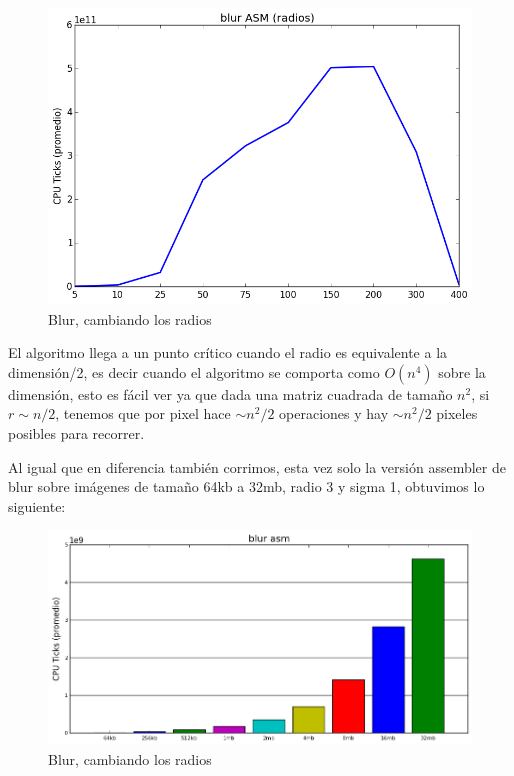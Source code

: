 \documentclass[a4paper]{article}
\begin{document}
\begin{figure}[h]
	\centerline{\includegraphics[scale=0.62]{imagenes/test_radio_size_ASM.png}}
	\caption{Blur, cambiando los radios}
\end{figure}


El algoritmo llega a un punto crítico cuando el radio es equivalente a la dimensión/2, es decir cuando el algoritmo se comporta como $O(n^4)$ sobre la dimensión, esto es fácil ver ya que dada una matriz cuadrada de tamaño $n^2$, si $r \sim n/2$, tenemos que por pixel hace $\sim n^2/2$ operaciones y hay $\sim n^2/2$ pixeles posibles para recorrer.

Al igual que en diferencia también corrimos, esta vez solo la versión assembler de blur sobre imágenes de tamaño 64kb a 32mb, radio 3 y sigma 1, obtuvimos lo siguiente:

\begin{figure}[h]
	\centerline{\includegraphics[scale=0.72]{imagenes/test_radio_cambiando_tamanios_assembly.png}}
	\caption{Blur, cambiando los radios}
\end{figure}
\end{document}
